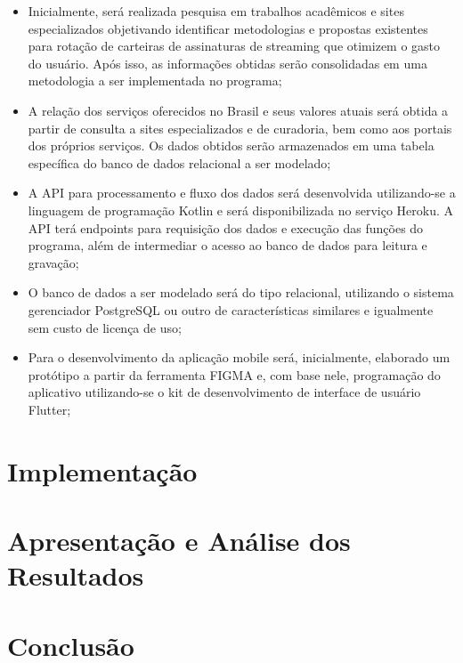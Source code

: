 \documentclass[conference]{IEEEtran}
\begin{document}
\begin{itemize}
\item Inicialmente, será realizada pesquisa em trabalhos acadêmicos e sites especializados objetivando identificar metodologias e propostas existentes para rotação de carteiras de assinaturas de streaming que otimizem o gasto do usuário. Após isso, as informações obtidas serão consolidadas em uma metodologia a ser implementada no programa;
\item A relação dos serviços oferecidos no Brasil e seus valores atuais será obtida a partir de consulta a sites especializados e de curadoria, bem como aos portais dos próprios serviços. Os dados obtidos serão armazenados em uma tabela específica do banco de dados relacional a ser modelado;
\item A API para processamento e fluxo dos dados será desenvolvida utilizando-se a linguagem de programação Kotlin e será disponibilizada no serviço Heroku. A API terá endpoints para requisição dos dados e execução das funções do programa, além de intermediar o acesso ao banco de dados para leitura e gravação;
\item O banco de dados a ser modelado será do tipo relacional, utilizando o sistema gerenciador PostgreSQL ou outro de características similares e igualmente sem custo de licença de uso;
\item Para o desenvolvimento da aplicação mobile será, inicialmente, elaborado um protótipo a partir da ferramenta FIGMA e, com base nele, programação do aplicativo utilizando-se o kit de desenvolvimento de interface de usuário Flutter;
\end{itemize}

\section{Implementação}

\section{Apresentação e Análise dos Resultados}

\section*{Conclusão}
\end{document}
